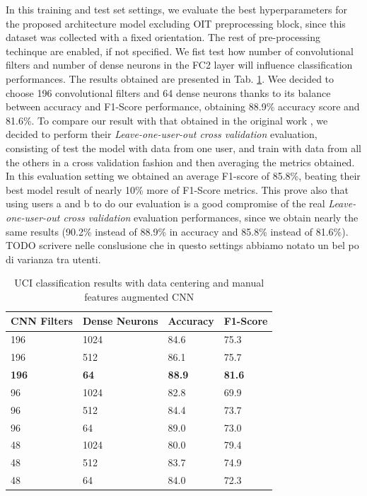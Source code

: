 In this training and test set settings, we evaluate the best hyperparameters for the proposed architecture model excluding OIT preprocessing block, since this dataset was collected with a fixed orientation. The rest of pre-processing techinque are enabled, if not specified. We fist test how number of convolutional filters and number of dense neurons in the FC2 layer will influence classification performances. The results obtained are presented in Tab. \ref{tab:model-selection}. Wee decided to choose 196 convolutional filters and 64 dense neurons thanks to its balance between accuracy and F1-Score performance, obtaining 88.9\% accuracy score and  81.6\%. To compare our result with that obtained in the original work \cite{blunck2013heterogeneity}, we decided to perform their \textit{Leave-one-user-out cross validation} evaluation, consisting of test the model with data from one user, and train with data from all the others in a cross validation fashion and then averaging the metrics obtained. In this evaluation setting we obtained an average F1-score of 85.8\%, beating their best model result of nearly 10\% more of F1-Score metrics. This prove also that using users a and b to do our evaluation is a good compromise of the real \textit{Leave-one-user-out cross validation} evaluation performances, since we obtain nearly the same results (90.2\% instead of 88.9\% in accuracy and 85.8\% instead of 81.6\%). TODO scrivere nelle conslusione che in questo settings abbiamo notato un bel po di varianza tra utenti.

\begin{table}[h]
	\begin{center}
		\begin{tabular}{ p{1.8cm}p{1.7cm}p{1.7cm}p{1.7cm} } 
			\hline
			CNN Filters & Dense Neurons & Accuracy & F1-Score \\ 
			\hline
			196 & 1024 & 84.6 & 75.3 \\
			196 & 512 & 86.1 & 75.7 \\ 
			\textbf{196} & \textbf{64} & \textbf{88.9} & \textbf{81.6} \\ 
			96 & 1024 & 82.8 & 69.9 \\
			96 & 512 & 84.4 & 73.7 \\ 
			96 & 64 & 89.0 & 73.0 \\  
			48 & 1024 & 80.0 & 79.4 \\
			48 & 512 & 83.7 & 74.9 \\ 
			48 & 64 & 84.0 & 72.3 \\
			\hline
		\end{tabular}
		\caption{\label{tab:model-selection} UCI classification results with data centering and manual features augmented CNN}
	\end{center}
\end{table}


